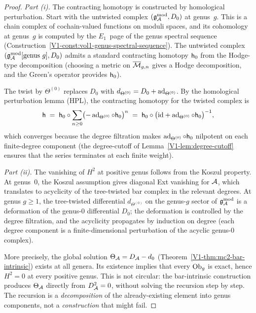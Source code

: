 \begin{proof}
\emph{Part (i).} The contracting homotopy is constructed by
homological perturbation. Start with the untwisted complex
$(\mathfrak{g}_{\mathcal{A}}^{\mathrm{mod}}, D_0)$ at genus~$g$. This is a chain complex of
cochain-valued functions on moduli spaces, and its cohomology
at genus~$g$ is computed by the $E_1$~page of the genus
spectral sequence
(Construction~\ref{V1-const:vol1-genus-spectral-sequence}).
The untwisted complex $(\mathfrak{g}_{\mathcal{A}}^{\mathrm{mod}}[\text{genus }g], D_0)$
admits a standard contracting homotopy $\mathsf{h}_0$ from the
Hodge-type decomposition (choosing a metric on $\overline{\mathcal{M}}_{g,n}$
gives a Hodge decomposition, and the Green's operator provides
$\mathsf{h}_0$).

The twist by $\Theta^{(0)}$ replaces $D_0$ with $d_{\Theta^{(0)}}
= D_0 + \operatorname{ad}_{\Theta^{(0)}}$. By the homological perturbation
lemma (HPL), the contracting homotopy for the twisted complex is
\begin{equation}%
\hCont
\;=\;
\hCont_0 \circ
\sum_{n \geq 0}
\bigl(-\ad_{\Theta^{(0)}} \circ \hCont_0\bigr)^n
\;=\;
\hCont_0 \circ
\bigl(\id + \ad_{\Theta^{(0)}} \circ \hCont_0\bigr)^{-1},
\end{equation}
which converges because the degree filtration makes
$\operatorname{ad}_{\Theta^{(0)}} \circ \mathsf{h}_0$ nilpotent on each
finite-degree component (the degree-cutoff of
Lemma~\ref{V1-lem:degree-cutoff} ensures that the series terminates
at each finite weight).

\medskip\noindent
\emph{Part (ii).} The vanishing of $H^2$ at positive genus
follows from the Koszul property. At genus~$0$, the Koszul
assumption gives diagonal Ext vanishing for $\mathcal{A}$, which
translates to acyclicity of the tree-twisted bar complex in
the relevant degrees. At genus $g \geq 1$, the tree-twisted
differential $d_{\Theta^{(0)}}$ on the genus-$g$ sector of
$\mathfrak{g}_{\mathcal{A}}^{\mathrm{mod}}$ is a deformation of the genus-$0$ differential
$D_0$; the deformation is controlled by the degree filtration,
and the acyclicity propagates by induction on degree
(each degree component is a finite-dimensional perturbation
of the acyclic genus-$0$ complex).

More precisely, the global solution $\Theta_{\mathcal{A}} = D_{\mathcal{A}} - d_0$
(Theorem~\ref*{V1-thm:mc2-bar-intrinsic}) exists at all genera.
Its existence implies that every $\mathrm{Ob}_g$ is exact, hence
$H^2 = 0$ at every positive genus. This is not circular: the
bar-intrinsic construction produces $\Theta_{\mathcal{A}}$ directly
from $D_{\mathcal{A}}^2 = 0$, without solving the recursion step by step.
The recursion is a \emph{decomposition} of the already-existing
element into genus components, not a \emph{construction} that
might fail.
\end{proof}


